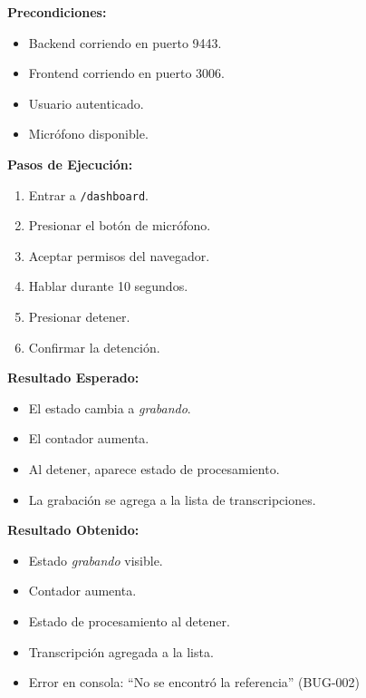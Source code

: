 \documentclass[12pt, a4paper]{article}
\newcommand{\prioChip}[2]{%
  \colorbox{#1}{\textcolor{white}{\footnotesize\textbf{#2}}}%
}
\newcommand{\statusChip}[2]{%
  \colorbox{#1}{\textcolor{white}{\footnotesize\textbf{#2}}}%
}
\begin{document}
\vspace{0.3cm}

\begin{tcolorbox}[enhanced, breakable, colback=white, colframe=critica,
  boxrule=1.5pt, arc=5pt,
  title={\textbf{CP-03} \enspace Iniciar y detener grabaci\'on \hfill \prioChip{critica}{Cr\'itica} \enspace \statusChip{falla-red}{FALLADO}},
  fonttitle=\color{white},
  attach boxed title to top left={yshift=-2mm,xshift=4mm},
  boxed title style={colback=critica,arc=3pt}]
\begin{minipage}[t]{0.48\linewidth}
\textbf{Precondiciones:}
\begin{itemize}[noitemsep,topsep=2pt]
  \item Backend corriendo en puerto 9443.
  \item Frontend corriendo en puerto 3006.
  \item Usuario autenticado.
  \item Micr\'ofono disponible.
\end{itemize}
\textbf{Pasos de Ejecuci\'on:}
\begin{enumerate}[noitemsep,topsep=2pt]
  \item Entrar a \texttt{/dashboard}.
  \item Presionar el bot\'on de micr\'ofono.
  \item Aceptar permisos del navegador.
  \item Hablar durante 10 segundos.
  \item Presionar detener.
  \item Confirmar la detenci\'on.
\end{enumerate}
\end{minipage}\hfill
\begin{minipage}[t]{0.48\linewidth}
\textbf{Resultado Esperado:}
\begin{itemize}[noitemsep,topsep=2pt]
  \item El estado cambia a \textit{grabando}.
  \item El contador aumenta.
  \item Al detener, aparece estado de procesamiento.
  \item La grabaci\'on se agrega a la lista de transcripciones.
\end{itemize}
\vspace{4pt}
\textbf{Resultado Obtenido:}
\begin{itemize}[noitemsep,topsep=2pt]
  \item[$\checkmark$] Estado \textit{grabando} visible.
  \item[$\checkmark$] Contador aumenta.
  \item[$\checkmark$] Estado de procesamiento al detener.
  \item[$\checkmark$] Transcripci\'on agregada a la lista.
  \item[$\times$] Error en consola: ``No se encontr\'o la referencia'' (BUG-002)
\end{itemize}
\end{minipage}
\end{tcolorbox}
\end{document}
